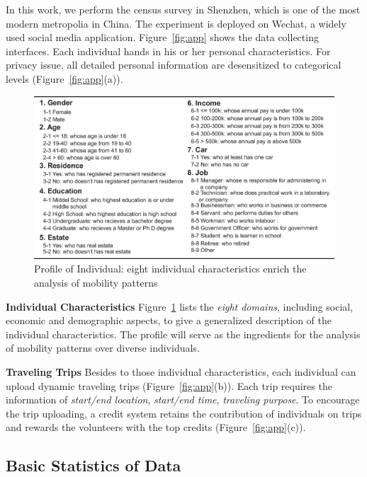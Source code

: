 In this work, we perform the census survey in Shenzhen, which is one of the most modern metropolia in China. The experiment is deployed on Wechat, a widely used social media application. Figure~\ref{fig:app} shows the data collecting interfaces. Each individual hands in his or her personal characteristics. For privacy issue, all detailed personal information are desensitized to categorical levels (Figure~\ref{fig:app}(a)).

\begin{figure}[htb!]
 \centering %
 \includegraphics[width=\columnwidth]{pictures/data_over}
 \caption{Profile of Individual: eight individual characteristics enrich the analysis of mobility patterns}
 \label{fig:data_over}
\end{figure}


\textbf{Individual Characteristics} Figure~\ref{fig:data_over} lists the \textit{eight domains}, including social, economic and demographic aspects, to give a generalized description of the individual characteristics. The profile will serve as the ingredients for the analysis of mobility patterns over diverse individuals.

\textbf{Traveling Trips} Besides to those individual characteristics, each individual can upload dynamic traveling trips (Figure~\ref{fig:app}(b)). Each trip requires the information of \textit{start/end location}, \textit{start/end time}, \textit{traveling purpose}. To encourage the trip uploading, a credit system retains the contribution of individuals on trips and rewards the volunteers with the top credits (Figure~\ref{fig:app}(c)).


\subsection{Basic Statistics of Data}

